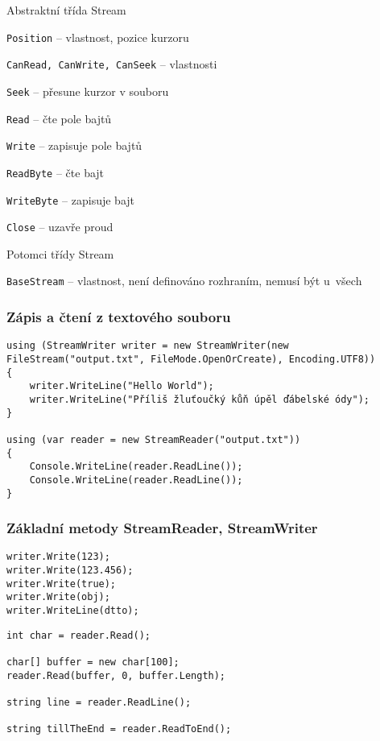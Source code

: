 \begin{frame}[fragile]
\vfill
\begin{bitemize}{Abstraktní třída Stream}
\item \lstinline|Position| -- vlastnost, pozice kurzoru
\item \lstinline|CanRead, CanWrite, CanSeek| -- vlastnosti
\item \lstinline|Seek| -- přesune kurzor v souboru
\item \lstinline|Read| -- čte pole bajtů
\item \lstinline|Write| -- zapisuje pole bajtů
\item \lstinline|ReadByte| -- čte bajt
\item \lstinline|WriteByte| -- zapisuje bajt
\item \lstinline|Close| -- uzavře proud
\end{bitemize}
\vfill
\begin{bitemize}{Potomci třídy Stream}
\item \lstinline|BaseStream| -- vlastnost, není definováno rozhraním, nemusí být u~všech
\end{bitemize}
\vfill
\end{frame}






\begin{frame}[fragile]
\frametitle{Zápis a čtení z textového souboru}
\begin{yesblock}
\begin{lstlisting}
using (StreamWriter writer = new StreamWriter(new FileStream("output.txt", FileMode.OpenOrCreate), Encoding.UTF8))
{
    writer.WriteLine("Hello World");
    writer.WriteLine("Příliš žluťoučký kůň úpěl ďábelské ódy");
}

using (var reader = new StreamReader("output.txt"))
{
    Console.WriteLine(reader.ReadLine());
    Console.WriteLine(reader.ReadLine());
}
\end{lstlisting}
\end{yesblock}
\end{frame}


\begin{frame}[fragile]
\frametitle{Základní metody StreamReader, StreamWriter}
\vfill
\begin{yesblock}
\begin{lstlisting}
writer.Write(123);
writer.Write(123.456);
writer.Write(true);
writer.Write(obj);
writer.WriteLine(dtto);
\end{lstlisting}
\end{yesblock}
\vfill
\begin{yesblock}
\begin{lstlisting}
int char = reader.Read();

char[] buffer = new char[100];
reader.Read(buffer, 0, buffer.Length);

string line = reader.ReadLine();

string tillTheEnd = reader.ReadToEnd();
\end{lstlisting}
\end{yesblock}
\vfill
\end{frame}



